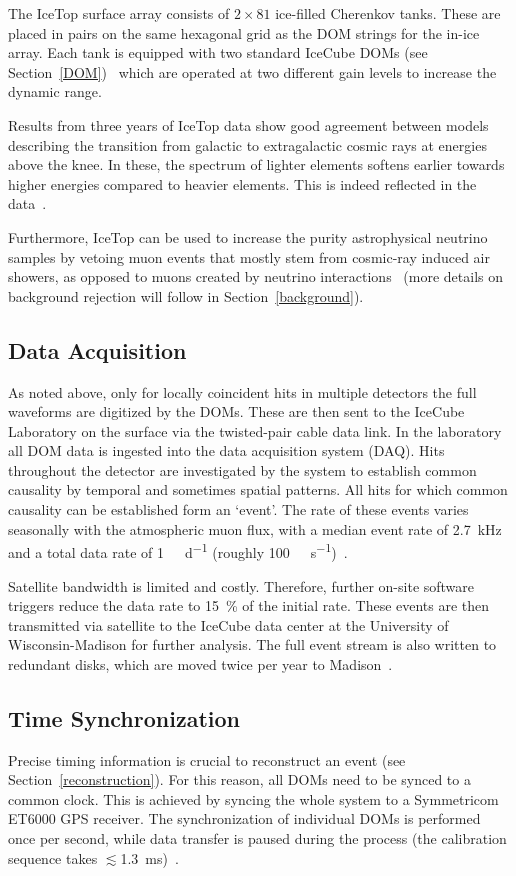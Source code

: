 The IceTop surface array consists of $2\times81$ ice-filled Cherenkov tanks. These are placed in pairs on the same hexagonal grid as the DOM strings for the in-ice array. Each tank is equipped with two standard IceCube DOMs (see Section~\ref{DOM})~\cite{Abbasi2013} which are operated at two different gain levels to increase the dynamic range.

Results from three years of IceTop data show good agreement between models describing the transition from galactic to extragalactic cosmic rays at energies above the knee. In these, the spectrum of lighter elements softens earlier towards higher energies compared to heavier elements. This is indeed reflected in the data~.

Furthermore, IceTop can be used to increase the purity astrophysical neutrino samples by vetoing muon events that mostly stem from cosmic-ray induced air showers, as opposed to muons created by neutrino interactions~ (more details on background rejection will follow in Section~\ref{background}).

\subsection{Data Acquisition}\label{data_acquisition}
As noted above, only for locally coincident hits in multiple detectors the full waveforms are digitized by the DOMs. These are then sent to the IceCube Laboratory on the surface via the twisted-pair cable data link. In the laboratory all DOM data is ingested into the data acquisition system (DAQ). Hits throughout the detector are investigated by the system to establish common causality by temporal and sometimes spatial patterns. All hits for which common causality can be established form an `event'. The rate of these events varies seasonally with the atmospheric muon flux, with a median event rate of \SI{2.7}{\kilo\Hz} and a total data rate of \SI{1}{\tera\byte\per\day} (roughly \SI{100}{\mega\bit\per\second})~\cite{Aartsen2017}.

Satellite bandwidth is limited and costly. Therefore, further on-site software triggers reduce the data rate to \SI{15}{\percent} of the initial rate. These events are then transmitted via satellite to the IceCube data center at the University of Wisconsin-Madison for further analysis. The full event stream is also written to redundant disks, which are moved twice per year to Madison~\cite{Aartsen2017}.

\subsection{Time Synchronization}
Precise timing information is crucial to reconstruct an event (see Section~\ref{reconstruction}). For this reason, all DOMs need to be synced to a common clock. This is achieved by syncing the whole system to a Symmetricom ET6000 GPS receiver. The synchronization of individual DOMs is performed once per second, while data transfer is paused during the process (the calibration sequence takes $\lesssim$\SI{1.3}{\milli\second})~.

